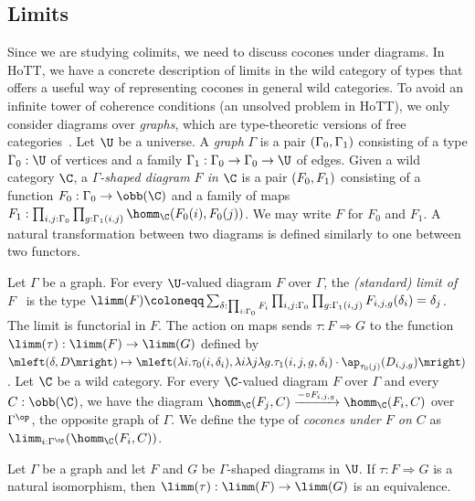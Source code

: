 \subsection*{Limits}

Since we are studying colimits, we need to discuss cocones under diagrams. In HoTT, we have a concrete description of limits in the wild category of types that offers a useful way of representing cocones in general wild categories.
To avoid an infinite tower of coherence conditions (an unsolved problem in HoTT), we only consider diagrams over \emph{graphs}, which are type-theoretic versions of free categories~\cite[Section 3.2]{CSL25}. Let $\U$ be a universe. A \emph{graph} $\Gamma$ is a pair $\mleft(\Gamma_0, \Gamma_1\mright)$ consisting of a type $\Gamma_0 : \U$ of vertices and a family $\Gamma_1 : \Gamma_0 \to \Gamma_0 \to \U$ of edges.
 Given a wild category $\C$, a \emph{$\Gamma$-shaped diagram $F$ in $\C$} is a pair $\mleft(F_0, F_1\mright)$ consisting of a function $F_0 : \Gamma_0 \to \obb(\C)$ and a family of maps $F_1 : \prod_{i,j : \Gamma_0}\prod_{g : \Gamma_1(i,j)}  \homm_{\C}(F_0(i) , F_0(j))$. We may write $F$ for $F_0$ and $F_1$. A natural transformation between two diagrams is defined similarly to one between two functors.

Let $\Gamma$ be a graph. For every $\U$-valued diagram $F$ over $\Gamma$, the \emph{(standard) limit of $F$}~\cite[Definition 4.2.7]{Avi} is the type $\limm(F)  \coloneqq \sum_{\delta : \prod_{i : \Gamma_0}F_i}\prod_{i,j : \Gamma_0}\prod_{g : \Gamma_1(i,j)} F_{i,j,g}(\delta_i) = \delta_j$. The limit is functorial in $F$. The action on maps sends $\tau : F \Rightarrow G$ to the function $\limm(\tau) : \limm(F) \to \limm(G)$ defined by $\mleft(\delta, D\mright) \mapsto \mleft(\lambda{i}.\tau_0(i, \delta_i), \lambda{i}\lambda{j}\lambda{g}.\tau_1(i,j,g, \delta_i) \cdot \ap_{\tau_0(j)}(D_{i,j,g}) \mright)$.
Let $\C$ be a wild category. For every $\C$-valued diagram $F$ over $\Gamma$ and every $C : \obb(\C)$, we have the diagram $\homm_{\C}(F_j, C) \xrightarrow{{-} \circ F_{i,j,g}} \homm_{\C}(F_i, C)$ over $\Gamma^{\op}$, the opposite graph of $\Gamma$. We define the type of \emph{cocones under $F$ on $C$} as $\limm_{i : \Gamma^{\op}}(\homm_{\C}(F_i , C))$.
\begin{lem} \label{limpreseq}
Let $\Gamma$ be a graph and let $F$ and $G$ be $\Gamma$-shaped diagrams in $\U$. If $\tau : F \Rightarrow G$ is a natural isomorphism, then $\limm(\tau) : \limm(F) \to \limm(G)$ is an equivalence. 
\end{lem}

